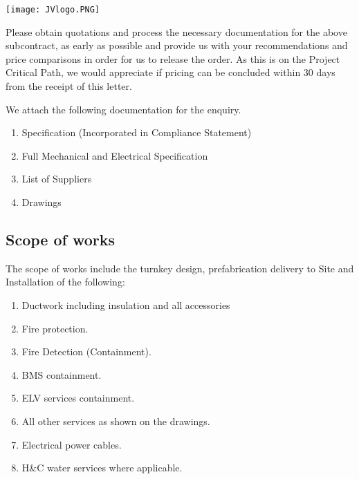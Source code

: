 \documentclass[a4paper,11pt,oneside]{article}
\begin{document}
\sffamily
\mbox{}
\texttt{[image: JVlogo.PNG]}
\vspace{1em}

\Date 


\TOMCD


\setlength{\parskip}{\baselineskip}


Please obtain quotations and process the necessary documentation for the above subcontract, as early as possible and provide us with your recommendations and price comparisons in order for us to release the order. As this is on the Project Critical Path, we would appreciate if pricing can be concluded within 30 days from the receipt of this letter.

We attach the following documentation for the enquiry. 

\begin{enumerate}

\item Specification (Incorporated in Compliance Statement)
\item Full Mechanical and Electrical Specification
\item List of Suppliers
\item Drawings
\end{enumerate}

\subsection*{Scope of works}

The scope of works include the turnkey design, prefabrication delivery to Site and Installation of the following:

\begin{enumerate}
\item  Ductwork including insulation and all accessories
\item  Fire protection. 
\item  Fire Detection (Containment).
\item  BMS containment.
\item  ELV services containment.
\item  All other services as shown on the drawings.
\item  Electrical power cables.
\item  H\&C water services where applicable.
\end{enumerate}
\end{document}
